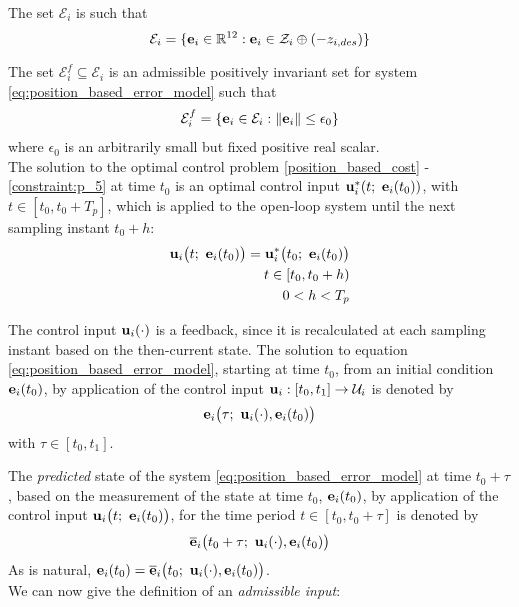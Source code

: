 The set $\mathcal{E}_i$ is such that
$$\mathcal{E}_i = \{\bm{\mathbf{e}}_i \in \mathbb{R}^{12} : \bm{\mathbf{e}}_i \in \mathcal{Z}_i \oplus (-z_{i,des} )\}$$

The set $\mathcal{E}_i^f \subseteq \mathcal{E}_i$ is an admissible positively
invariant set  for system \eqref{eq:position_based_error_model}
such that
\begin{align}
  \mathcal{E}_i^f = \{\bm{\mathbf{e}}_i \in \mathcal{E}_i : \|\bm{\mathbf{e}}_i\| \leq \epsilon_0 \}
\end{align}
where $\epsilon_0$ is an arbitrarily small but fixed positive real scalar.\\

The solution to the optimal control problem \eqref{position_based_cost} -
\eqref{constraint:p_5} at time $t_0$ is an optimal control input
$\bm{\mathbf{u}}_i^{\ast}(t;\ \bm{\mathbf{e}}_i(t_0))$, with $t \in [t_0, t_0 + T_p]$, which
is applied to the open-loop system until the next sampling instant $t_0 + h$:
\begin{align}
  \vect{u}_i\big(t;\ \vect{e}_i(t_0)\big) = \vect{u}_i^{\ast}\big(t_0;\ \vect{e}_i(t_0)\big) \label{eq:position_based_optimal_u} \\
  t \in [t_0, t_0 + h) \nonumber \\
  0 < h < T_p \nonumber
\end{align}

The control input $\bm{\mathbf{u}}_i(\cdot)$ is a feedback, since it is
recalculated at each sampling instant based on the then-current state. The
solution to equation \eqref{eq:position_based_error_model}, starting at time
$t_0$, from an initial condition $\bm{\mathbf{e}}_i(t_0)$, by application of the
control input $\bm{\mathbf{u}}_i : [t_0, t_1] \to \mathcal{U}_i$ is denoted by
$$\bm{\mathbf{e}}_i\big(\tau;\ \bm{\mathbf{u}}_i(\cdot), \bm{\mathbf{e}}_i(t_0)\big)$$
with $\tau \in [t_0, t_1]$.

The \textit{predicted} state of the system \eqref{eq:position_based_error_model}
at time $t_0 + \tau$, based on the measurement of the state at time
$t_0$, $\bm{\mathbf{e}}_i(t_0)$, by application of the control input
$\vect{u}_i\big(t;\ \vect{e}_i(t_0)\big)$, for the time period $t \in [t_0, t_0 + \tau]$
is denoted by
$$\overline{\bm{\mathbf{e}}}_i\big(t_0 + \tau;\ \bm{\mathbf{u}}_i(\cdot), \bm{\mathbf{e}}_i(t_0)\big)$$
As is natural,
$\bm{\mathbf{e}}_i(t_0) = \overline{\bm{\mathbf{e}}}_i\big(t_0;\ \bm{\mathbf{u}}_i(\cdot), \bm{\mathbf{e}}_i(t_0)\big)$.\\

We can now give the definition of an \textit{admissible input}:

